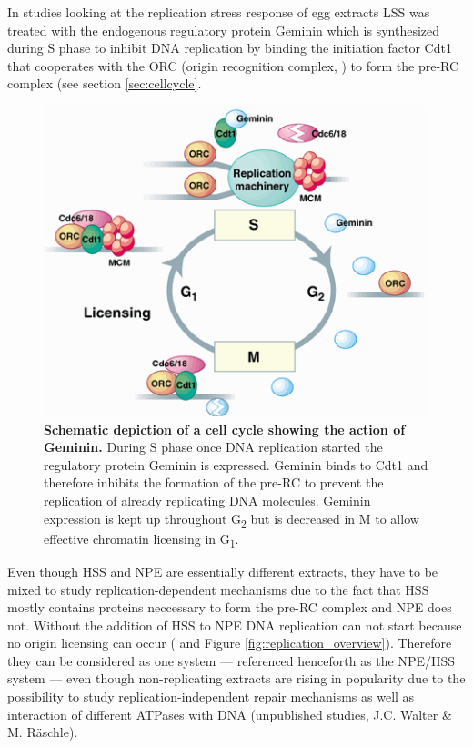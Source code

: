 In studies looking at the replication stress response of egg extracts LSS was treated with the endogenous regulatory protein Geminin which is synthesized during S phase to inhibit DNA replication by binding the initiation factor Cdt1 that cooperates with the ORC (origin recognition complex, \cite{Cook.2004}) to form the pre-RC complex (see section \ref{sec:cellcycle}.
\begin{figure}[H]
    \centering
    \includegraphics[width=.78\textwidth]{resources/images/Intro/gemininCell.png}
    \caption[Schematic depiction of a cell cycle showing the action of Geminin.]{\textbf{Schematic depiction of a cell cycle showing the action of Geminin. } During S phase once DNA replication started the regulatory protein Geminin is expressed. Geminin binds to Cdt1 and therefore inhibits the formation of the pre-RC to prevent the replication of already replicating DNA molecules. Geminin expression is kept up throughout G\textsubscript{2} but is decreased in M to allow effective chromatin licensing in G\textsubscript{1}. \citep{Lygerou.2000}}
    \label{fig:geminin}
\end{figure}
Even though HSS and NPE are essentially different extracts, they have to be mixed to study replication-dependent mechanisms due to the fact that HSS mostly contains proteins neccessary to form the pre-RC complex and NPE does not. Without the addition of HSS to NPE DNA replication can not start because no origin licensing can occur (\cite{Lebofsky.2009} and Figure \ref{fig:replication_overview}). 
Therefore they can be considered as one system --- referenced henceforth as the NPE/HSS system --- even though non-replicating extracts are rising in popularity due to the possibility to study replication-independent repair mechanisms as well as interaction of different ATPases with DNA (unpublished studies, J.C. Walter \& M. Räschle).

